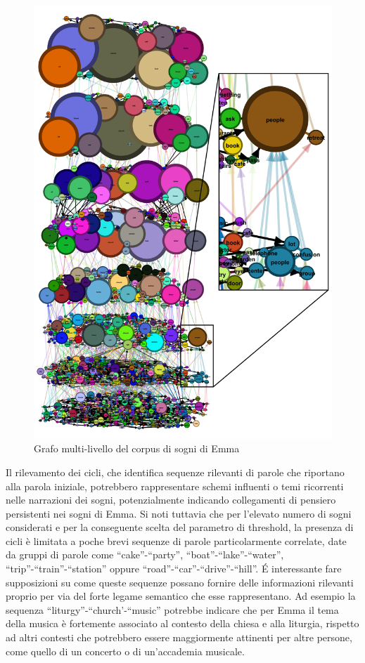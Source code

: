 \begin{figure}
    \centering
    \includegraphics[width=1\textwidth]{Immagini/mlg_emma_focus_example}
    \caption{Grafo multi-livello del corpus di sogni di Emma}
    \label{fig:mlg-emma-example}
\end{figure}

Il rilevamento dei cicli, che identifica sequenze rilevanti di parole che riportano alla parola iniziale, potrebbero
rappresentare schemi influenti o temi ricorrenti nelle narrazioni dei sogni,
potenzialmente indicando collegamenti di pensiero persistenti nei sogni di Emma.
Si noti tuttavia che per l'elevato numero di sogni considerati e per la conseguente scelta del parametro di threshold,
la presenza di cicli è limitata a poche brevi sequenze di parole particolarmente correlate, date da gruppi di
parole come ``cake''-``party'', ``boat''-``lake''-``water'', ``trip''-``train''-``station'' oppure
``road''-``car''-``drive''-``hill''.
\'E interessante fare supposizioni su come queste sequenze possano fornire delle informazioni rilevanti proprio per
via del forte legame semantico che esse rappresentano.
Ad esempio la sequenza ``liturgy''-``church'-``music'' potrebbe indicare che per Emma il tema della musica è
fortemente associato al contesto della chiesa e alla liturgia, rispetto ad altri contesti che potrebbero
essere maggiormente attinenti per altre persone, come quello di un concerto o di un'accademia musicale.


